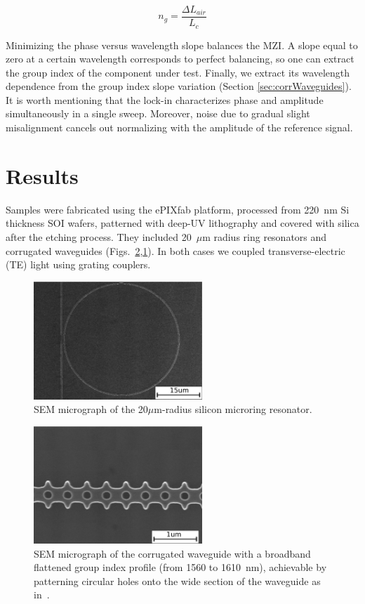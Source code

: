 \documentclass[journal]{IEEEtran}
\begin{document}
\begin{equation}
  n_{g} = \frac{\Delta L_{air}}{L_{c}}
  \label{eq:group_index_pathBalancing}
\end{equation}

Minimizing the phase versus wavelength slope balances the MZI.
A slope equal to zero at a certain wavelength corresponds to perfect balancing, so one can extract the group index of the component under test.
Finally, we extract its wavelength dependence from the group index slope variation (Section \ref{sec:corrWaveguides}).
It is worth mentioning that the lock-in characterizes phase and amplitude simultaneously in a single sweep.
Moreover, noise due to gradual slight misalignment cancels out normalizing with the amplitude of the reference signal.

\section{Results}
Samples were fabricated using the ePIXfab platform, processed from 220~nm Si thickness SOI wafers, patterned with deep-UV lithography and covered with silica after the etching process.
They included 20~$\mu$m radius ring resonators and corrugated waveguides (Figs.~\ref{fig:sem},\ref{fig:semRingPaperRings}).
In both cases we coupled transverse-electric (TE) light using grating couplers.

\begin{figure}[htb]
    \centering
    \includegraphics[width=2.5in]{ringTEscale2}
    \caption{SEM micrograph of the 20$\mu$m-radius silicon microring resonator.}
    \label{fig:semRingPaperRings}
\end{figure}


\begin{figure}[htb]
	\centering
	\includegraphics[width=2.5in]{corrTEscale}	
	\caption{SEM micrograph of the corrugated waveguide with a broadband flattened group index profile (from 1560 to 1610~nm), achievable by patterning circular holes onto the wide section of the waveguide as in~\cite{Brimont2010}.}
	\label{fig:sem}
 \end{figure} 
\end{document}
